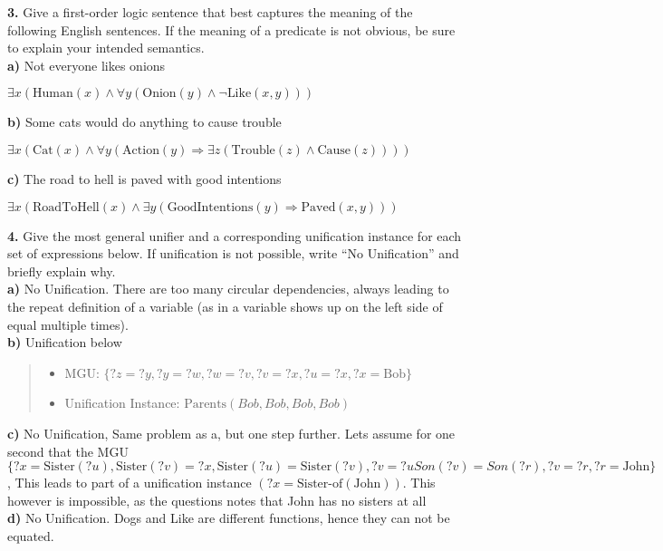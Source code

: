 \documentclass[titlepage]{article}
\begin{document}
\newpage

\noindent \textbf{3. } Give a first-order logic sentence that best captures the meaning of the following English sentences. If the meaning of a predicate is not obvious, be sure to explain your intended semantics.\\

\textbf{a) } Not everyone likes onions

\centerline{$\exists x(\text{Human}(x) \wedge \forall y(\text{Onion}(y) \wedge \neg\text{Like}(x, y)))$}
\centerline{}

\textbf{b) } Some cats would do anything to cause trouble

\centerline{$\exists x(\text{Cat}(x) \wedge \forall y(\text{Action}(y) \Rightarrow \exists z(\text{Trouble}(z) \wedge \text{Cause}(z))))$}
\centerline{}

\textbf{c) } The road to hell is paved with good intentions

\centerline{$\exists x(\text{RoadToHell}(x) \wedge \exists y(\text{GoodIntentions}(y) \Rightarrow \text{Paved}(x, y)))$}
\centerline{}

\noindent \textbf{4. } Give the most general unifier and a corresponding unification instance for each set of expressions below. If unification is not possible, write ``No Unification'' and briefly explain why.\\

\textbf{a) } No Unification. There are too many circular dependencies, always leading to the repeat definition of a variable (as in a variable shows up on the left side of equal multiple times).\\

\textbf{b) } Unification below

\begin{quote}	
	\begin{itemize}
		\item MGU: $\{?z=?y, ?y=?w, ?w=?v, ?v=?x, ?u=?x, ?x=\text{Bob}\}$
		\item Unification Instance: $\text{Parents}(Bob, Bob, Bob, Bob)$
	\end{itemize}
\end{quote}

\textbf{c) } No Unification, Same problem as a, but one step further. Lets assume for one second that the MGU $\{?x=\text{Sister}(?u), \text{Sister}(?v)=?x, \text{Sister}(?u)=\text{Sister}(?v), ?v=?u Son(?v)=Son(?r), ?v=?r, ?r=\text{John}\}$, This leads to part of a unification instance $(?x=\text{Sister-of}(\text{John}))$. This however is impossible, as the questions notes that John has no sisters at all\\

\textbf{d) } No Unification. Dogs and Like are different functions, hence they can not be equated.
\end{document}
